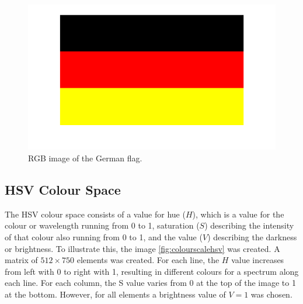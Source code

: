 \begin{figure}[H]
	\centering
		\includegraphics[width=\textwidth]{images/germanflag.png}
		\caption{RGB image of the German flag.}
		\label{fig:germanflag}
\end{figure}

\subsection{HSV Colour Space}
The HSV colour space consists of a value for hue ($H$), which is a value for the colour or wavelength running from 0 to 1, saturation ($S$) describing the intensity of that colour also running from 0 to 1, and the value ($V$) describing the darkness or brightness. To illustrate this, the image \ref{fig:colourscalehsv} was created. A matrix of $512\times750$ elements was created. For each line, the $H$ value increases from left with 0 to right with 1, resulting in different colours for a spectrum along each line. For each column, the S value varies from 0 at the top of the image to 1 at the bottom. However, for all elements a brightness value of $V=1$ was chosen.

